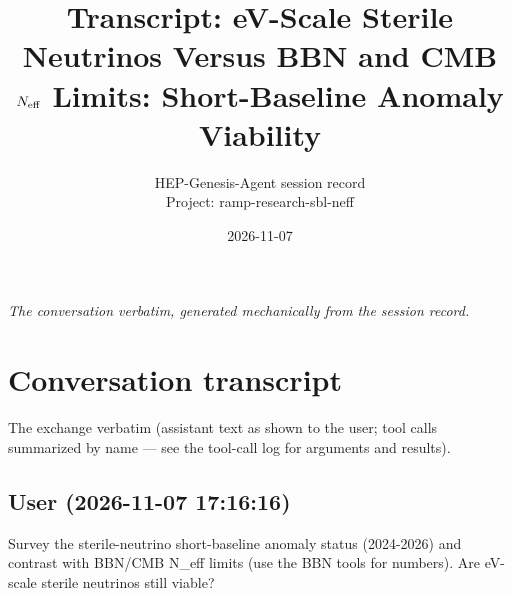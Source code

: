 \documentclass[11pt,a4paper]{article}
\title{Transcript: eV-Scale Sterile Neutrinos Versus BBN and CMB $N_{\rm eff}$ Limits: Short-Baseline Anomaly Viability}
\author{HEP-Genesis-Agent session record \\ \small Project: ramp-research-sbl-neff}
\date{2026-11-07}
\begin{document}
\maketitle
\noindent\textit{\small The conversation verbatim, generated mechanically from the session record.}
\vspace{1em}



\appendix
\section{Conversation transcript}
\label{app:transcript}
The exchange verbatim (assistant text as shown to the user; tool calls summarized by name --- see the tool-call log for arguments and results).
\subsection*{User \small(2026-11-07 17:16:16)}
Survey the sterile-neutrino short-baseline anomaly status (2024-2026) and contrast with BBN/CMB N\_eff limits (use the BBN tools for numbers). Are eV-scale sterile neutrinos still viable?
\end{document}
